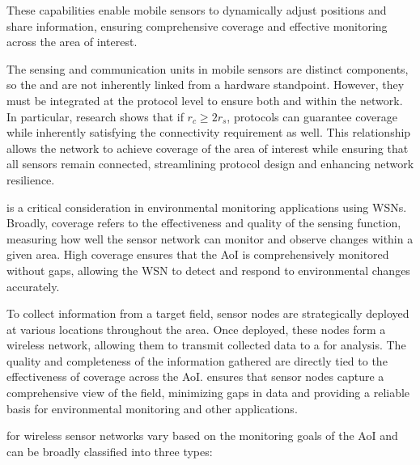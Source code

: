 \documentclass[a4paper, 12pt]{report}
\begin{document}
    These capabilities enable mobile sensors to dynamically adjust positions and share information, ensuring comprehensive coverage and effective monitoring across the area of interest.

    The sensing and communication units in mobile sensors are distinct components, so the  and  are not inherently linked from a hardware standpoint. However, they must be integrated at the protocol level to ensure both  and  within the network. In particular, research shows that if $r_c \ge 2 r_s$, protocols can guarantee coverage while inherently satisfying the connectivity requirement as well. This relationship allows the network to achieve  coverage of the area of interest while ensuring that all sensors remain connected, streamlining protocol design and enhancing network resilience.

     is a critical consideration in environmental monitoring applications using WSNs. Broadly, coverage refers to the effectiveness and quality of the sensing function, measuring how well the sensor network can monitor and observe changes within a given area. High coverage ensures that the AoI is comprehensively monitored without gaps, allowing the WSN to detect and respond to environmental changes accurately.

    To collect information from a target field, sensor nodes are strategically deployed at various locations throughout the area. Once deployed, these nodes form a wireless network, allowing them to transmit collected data to a  for analysis. The quality and completeness of the information gathered are directly tied to the effectiveness of coverage across the AoI.  ensures that sensor nodes capture a comprehensive view of the field, minimizing gaps in data and providing a reliable basis for environmental monitoring and other applications.

     for wireless sensor networks vary based on the monitoring goals of the AoI and can be broadly classified into three types:
\end{document}
